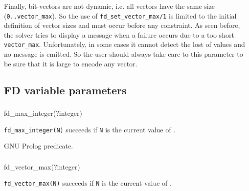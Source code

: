 Finally, bit-vectors are not dynamic, i.e. all vectors have the same size
(\texttt{0..vector\_max}). So the use of \texttt{fd\_set\_vector\_max/1} is
limited to the initial definition of vector sizes and must occur before any
constraint. As seen before, the solver tries to display a message when a
failure occurs due to a too short \texttt{vector\_max}. Unfortunately, in
some cases it cannot detect the lost of values and no message is emitted. So
the user should always take care to this parameter to be sure that it is
large to encode any vector.

\subsection{FD variable parameters}

\subsubsection{\label{fd-max-integer/1}}

\begin{TemplatesOneCol}
fd\_max\_integer(?integer)

\end{TemplatesOneCol}

\Description

\texttt{fd\_max\_integer(N)} succeeds if \texttt{N} is the current value of
 .

\begin{PlErrors}


\end{PlErrors}

\Portability

GNU Prolog predicate.

\subsubsection{}

\begin{TemplatesOneCol}
fd\_vector\_max(?integer)

\end{TemplatesOneCol}

\Description

\texttt{fd\_vector\_max(N)} succeeds if \texttt{N} is the current value of
 .

